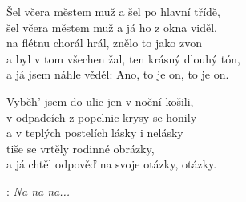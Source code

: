 
Šel včera městem muž a šel po hlavní třídě,\\
šel včera městem muž a já ho z okna viděl,\\
na flétnu chorál hrál, znělo to jako zvon\\
a byl v tom všechen žal, ten krásný dlouhý tón,\\
a já jsem náhle věděl: Ano, to je on, to je on.\\

\begin{large}

Vyběh' jsem do ulic jen v noční košili,\\
v odpadcích z popelnic krysy se honily\\
a v teplých postelích lásky i nelásky\\
tiše se vrtěly rodinné obrázky,\\
a já chtěl odpověď na svoje otázky, otázky.\\

\end{large}

\textregistered:  \emph{Na na na...}\\

